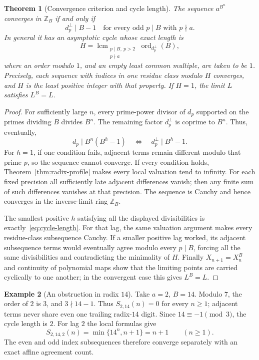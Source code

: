 \documentclass[11pt,a4paper]{article}
\newtheorem{theorem}{Theorem}[section]
\theoremstyle{definition}
\newtheorem{example}[theorem]{Example}
\newcommand{\Z}{\mathbb Z}
\newcommand{\ord}{\operatorname{ord}}
\newcommand{\lcm}{\operatorname{lcm}}
\begin{document}
\begin{theorem}[Convergence criterion and cycle length]\label{thm:cycles}
The sequence $a^{B^n}$ converges in $\Z_B$ if and only if
\begin{equation}\label{eq:convergence}
d_p^{\perp}\mid B-1
\quad\text{for every odd }p\mid B\text{ with }p\nmid a.
\end{equation}
In general it has an asymptotic cycle whose exact length is
\begin{equation}\label{eq:cycle-length}
H=\lcm_{\substack{p\mid B,\ p>2\\p\nmid a}}
\ord_{d_p^{\perp}}(B),
\end{equation}
where an order modulo $1$, and an empty least common multiple, are taken
to be $1$. Precisely, each sequence with indices in one residue class
modulo $H$ converges, and $H$ is the least positive integer with that property.
If $H=1$, the limit $L$ satisfies $L^B=L$.
\end{theorem}
\begin{proof}
For sufficiently large $n$, every prime-power divisor of $d_p$ supported on
the primes dividing $B$ divides $B^n$. The remaining factor $d_p^{\perp}$
is coprime to $B^n$. Thus, eventually,
\[
d_p\mid B^n(B^h-1)
\quad\Longleftrightarrow\quad
 d_p^{\perp}\mid B^h-1.
\]
For $h=1$, if one condition fails, adjacent terms remain different modulo
that prime $p$, so the sequence cannot converge. If every condition holds,
Theorem~\ref{thm:radix-profile} makes every local valuation tend to infinity.
For each fixed precision all sufficiently late adjacent differences vanish;
then any finite sum of such differences vanishes at that precision. The
sequence is Cauchy and hence converges in the inverse-limit ring $\Z_B$.

The smallest positive $h$ satisfying all the displayed divisibilities is
exactly~\eqref{eq:cycle-length}. For that lag, the same valuation argument
makes every residue-class subsequence Cauchy. If a smaller positive lag
worked, its adjacent subsequence terms would eventually agree modulo every
$p\mid B$, forcing all the same divisibilities and contradicting the
minimality of $H$. Finally $X_{n+1}=X_n^B$ and continuity of polynomial
maps show that the limiting points are carried cyclically to one another;
in the convergent case this gives $L^B=L$.
\end{proof}

\begin{example}[An obstruction in radix $14$]
Take $a=2$, $B=14$. Modulo $7$, the order of $2$ is $3$, and
$3\nmid14-1$. Thus $S_{2,14}(n)=0$ for every $n\ge1$; adjacent terms never
share even one trailing radix-$14$ digit. Since $14\equiv-1\pmod3$, the
cycle length is $2$. For lag $2$ the local formulas give
\[
S_{2,14,2}(n)=\min\{14^n,n+1\}=n+1\qquad(n\ge1).
\]
The even and odd index subsequences therefore converge separately with an
exact affine agreement count.
\end{example}
\end{document}
